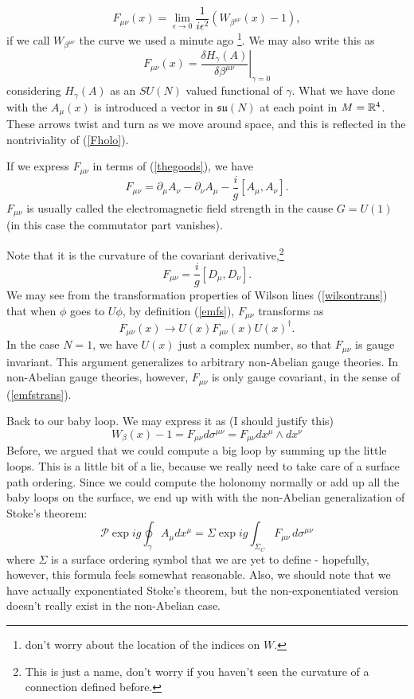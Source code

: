 \documentclass[main.tex]{subfiles}
\begin{document}
\begin{equation} \label{Fholo}
F_{\mu \nu} (x) = \lim_{\epsilon \to 0} \frac{1}{i \epsilon^2} \left(W_{\beta^{\mu \nu}} (x) - 1 \right),
\end{equation}
if we call $W_{\beta^{\mu \nu}}$ the curve we used a minute ago \footnote{don't worry about the location of the indices on $W$.}. We may also write this as
\[
F_{\mu \nu} (x) = \left. \frac{\delta H_{\gamma}(A)}{\delta \beta^{\mu \nu}} \right\vert_{\gamma = 0}
\]
considering $H_\gamma (A)$ as an $SU(N)$ valued functional of $\gamma$.
What we have done with the $A_\mu (x)$ is introduced a vector in $\mathfrak{su}(N)$ at each point in $M = \mathbb{R}^4$. These arrows twist and turn as we move around space, and this is reflected in the nontriviality of (\ref{Fholo}). 

If we express $F_{\mu \nu}$ in terms of (\ref{thegoods}), we have
\begin{equation} \label{emfs}
\boxed{F_{\mu \nu} = \partial_\mu A_\nu - \partial_\nu A_\mu - \frac{i}{g} [A_\mu, A_\nu].}
\end{equation}
$F_{\mu \nu}$ is usually called the electromagnetic field strength in the cause $G = U(1)$ (in this case the commutator part vanishes). 

Note that it is the curvature of the covariant derivative,\footnote{This is just a name, don't worry if you haven't seen the curvature of a connection defined before.}
\[
F_{\mu \nu} = \frac{i}{g}[D_\mu, D_\nu].
\]
We may see from the transformation properties of Wilson lines (\ref{wilsontrans}) that when $\phi$ goes to $U \phi$, by definition (\ref{emfs}), $F_{\mu \nu}$ transforms as
\begin{equation} \label{emfstrans}
\boxed{F_{\mu \nu} (x) \to U(x) F_{\mu \nu} (x) U(x)^\dagger.}
\end{equation}
In the case $N = 1$, we have $U(x)$ just a complex number, so that $F_{\mu \nu}$ is gauge invariant. This argument generalizes to arbitrary non-Abelian gauge theories. In non-Abelian gauge theories, however, $F_{\mu \nu}$ is only gauge covariant, in the sense of (\ref{emfstrans}).

Back to our baby loop. We may express it as (I should justify this)
\[
W_\beta (x) -1 = F_{\mu \nu} d\sigma^{\mu \nu} = F_{\mu \nu}  dx^\mu \wedge dx^\nu
\]
Before, we argued that we could compute a big loop by summing up the little loops. This is a little bit of a lie, because we really need to take care of a surface path ordering\cite{broda}. Since we could compute the holonomy normally or add up all the baby loops on the surface, we end up with with the non-Abelian generalization of Stoke's theorem:
\[
\mathcal{P} \exp{i g\oint_\gamma A_\mu dx^\mu} = 
\Sigma \exp{i g \int_{\Sigma_C} F_{\mu \nu} \, d\sigma^{\mu \nu}}
\]
where $\Sigma$ is a surface ordering symbol that we are yet to define - hopefully, however, this formula feels somewhat reasonable. Also, we should note that we have actually exponentiated Stoke's theorem, but the non-exponentiated version doesn't really exist in the non-Abelian case\cite{broda}.
\end{document}
